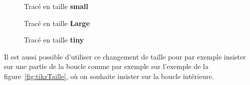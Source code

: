 \documentclass[a4paper,11pt]{article}                      %
\begin{document}
\begin{figure}[!htb]
\centering
\begin{tikzexample}[title=,]
{\small
{}
}
 \end{tikzexample}
\caption{Tracé en taille \textbf{small}}
\label{fig:tikzsmall}
\end{figure} 

\begin{figure}[!htb]
\centering
\begin{tikzexample}[title=,   righthand width=0.55\textwidth,]
{\Large
{}
}
 \end{tikzexample}
\caption{Tracé en taille \textbf{Large}}
\label{fig:tikzLarge}
\end{figure} 

\begin{figure}[!htb]
\centering
\begin{tikzexample}[title=,   righthand width=0.45\textwidth,]
{\tiny
{}
}
 \end{tikzexample}
\caption{Tracé en taille \textbf{tiny}}
\label{fig:tikztiny}
\end{figure} 

Il est aussi possible d'utiliser ce changement de taille pour par exemple insister sur une partie de la boucle comme par exemple sur l'exemple de la figure~\ref{fig:tikzTaille}, où on souhaite insister sur la boucle intérieure.
\end{document}
